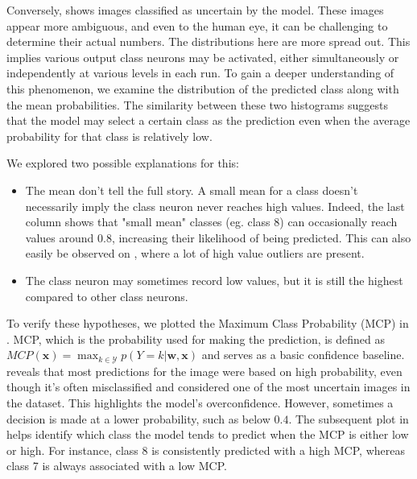 Conversely,  shows images classified as uncertain by the model. These images appear more ambiguous, and even to the human eye, it can be challenging to determine their actual numbers. The distributions here are more spread out. This implies various output class neurons may be activated, either simultaneously or independently at various levels in each run. To gain a deeper understanding of this phenomenon, we examine the distribution of the predicted class along with the mean probabilities. The similarity between these two histograms suggests that the model may select a certain class as the prediction even when the average probability for that class is relatively low.

We explored two possible explanations for this:
\begin{itemize}
    \item The mean don't tell the full story. A small mean for a class doesn't necessarily imply the class neuron never reaches high values. Indeed, the last column shows that "small mean" classes (eg. class 8) can occasionally reach values around $0.8$, increasing their likelihood of being predicted. This can also easily be observed on , where a lot of high value outliers are present. 
    \item The class neuron may sometimes record low values, but it is still the highest compared to other class neurons.
\end{itemize}
To verify these hypotheses, we plotted the Maximum Class Probability (MCP) in . MCP, which is the probability used for making the prediction, is defined as $ MCP(\boldsymbol{x}) = \max _{k \in \mathcal{Y}} p(Y=k | \boldsymbol{w}, \boldsymbol{x}) $ and serves as a basic confidence baseline.  reveals that most predictions for the image were based on high probability, even though it's often misclassified and considered one of the most uncertain images in the dataset. This highlights the model's overconfidence. However, sometimes a decision is made at a lower probability, such as below $ 0.4 $. The subsequent plot in  helps identify which class the model tends to predict when the MCP is either low or high. For instance, class 8 is consistently predicted with a high MCP, whereas class 7 is always associated with a low MCP.

